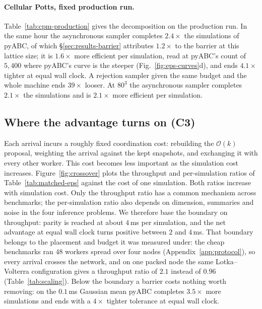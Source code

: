 \documentclass[10pt]{article}
\theoremstyle{plain}
\theoremstyle{definition}
\begin{document}
\paragraph{Cellular Potts, fixed production run.} Table~\ref{tab:cpm-production} gives the decomposition on the production run. In the same hour the asynchronous sampler completes $2.4\times$ the simulations of pyABC, of which \S\ref{sec:results-barrier} attributes $1.2\times$ to the barrier at this lattice size; it is $1.6\times$ more efficient per simulation, read at pyABC's count of $5{,}400$ where pyABC's curve is the steeper (Fig.~\ref{fig:eps-curves}d), and ends $4.1\times$ tighter at equal wall clock. A rejection sampler given the same budget and the whole machine ends $39\times$ looser. At $80^3$ the asynchronous sampler completes $2.1\times$ the simulations and is $2.1\times$ more efficient per simulation.
\subsection{Where the advantage turns on (C3)}\label{sec:results-boundary}

Each arrival incurs a roughly fixed coordination cost: rebuilding the $\mathcal{O}(k)$ proposal, weighting the arrival against the kept snapshots, and exchanging it with every other worker. This cost becomes less important as the simulation cost increases. Figure~\ref{fig:crossover} plots the throughput and per-simulation ratios of Table~\ref{tab:matched-eps} against the cost of one simulation. Both ratios increase with simulation cost. Only the throughput ratio has a common mechanism across benchmarks; the per-simulation ratio also depends on dimension, summaries and noise in the four inference problems. We therefore base the boundary on throughput: parity is reached at about $4$\,ms per simulation, and the net advantage at equal wall clock turns positive between $2$ and $4$\,ms. That boundary belongs to the placement and budget it was measured under: the cheap benchmarks ran $48$ workers spread over four nodes (Appendix~\ref{app:protocol}), so every arrival crosses the network, and on one packed node the same Lotka--Volterra configuration gives a throughput ratio of $2.1$ instead of $0.96$ (Table~\ref{tab:scaling}). Below the boundary a barrier costs nothing worth removing: on the $0.1$\,ms Gaussian mean pyABC completes $3.5\times$ more simulations and ends with a $4\times$ tighter tolerance at equal wall clock.
\end{document}

